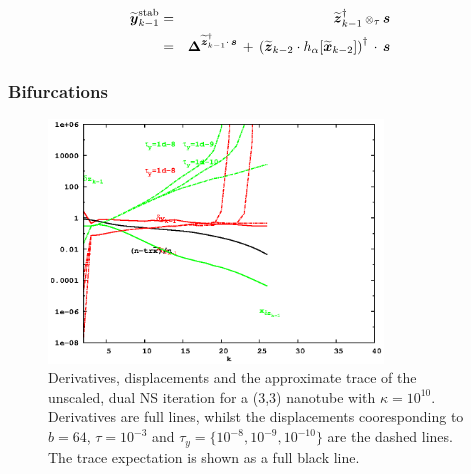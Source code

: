 \documentclass[letterpaper,twocolumn,amsmath,amsfont,amssymb,english,aps,jcp,preprintnumbers,groupaddress,nofootinbib,tightenlines]{revtex4}
\newcommand{\mat}[1]{\boldsymbol{#1}}
\newcommand{\ot}{ {\scriptstyle \otimes}_{ \tau } }
\begin{document}
\begin{eqnarray}
\widetilde{\mat{y}}^{\rm stab}_{k-1} &=& \widetilde{\mat{z}}^{\dagger}_{k-1} \, \ot \, \mat{s} \\
                                  &=& \mat{\Delta}^{\widetilde{\mat{z}}^\dagger_{k-1} \cdot \, \mat{s}} \, + \,
\left( \widetilde{\mat{z}}_{k-2} \cdot h_\alpha[ \widetilde{\mat{x}}_{k-2}] \right)^\dagger \, \cdot \, \mat{s}
\end{eqnarray}

\subsubsection{Bifurcations}

\begin{figure}[h]
\includegraphics[width=3.5in]{fig_33_tube_cond_10_noscaling/33_nanotube_cond10_noscale_dual.eps}
\caption{Derivatives, displacements and the approximate trace of the unscaled, dual NS iteration for a (3,3) nanotube with $\kappa =10^{10}$.
Derivatives are full lines, whilst the displacements cooresponding to $b=64$, $\tau=10^{-3}$ and $\tau_y=\{10^{-8}, 10^{-9}, 10^{-10}\}$
are the dashed lines.  The trace expectation is shown as a full black line. }
\end{figure}


\end{document}
